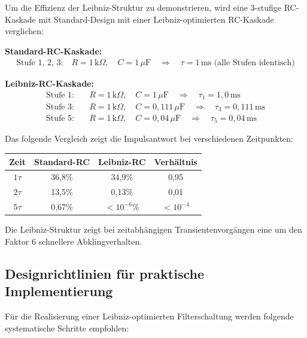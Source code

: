 \documentclass[a4paper,12pt,twoside]{report}
\theoremstyle{definition}
\begin{document}
Um die Effizienz der Leibniz-Struktur zu demonstrieren, wird eine 3-stufige RC-Kaskade mit Standard-Design mit einer Leibniz-optimierten RC-Kaskade verglichen:

\textbf{Standard-RC-Kaskade:}
\begin{align}
	\text{Stufe 1, 2, 3:} \quad R = 1\,\text{k}\Omega, \quad C = 1\,\mu\text{F} \quad \Rightarrow \quad \tau = 1\,\text{ms (alle Stufen identisch)}
\end{align}

\textbf{Leibniz-RC-Kaskade:}
\begin{align}
	\text{Stufe 1:} &\quad R = 1\,\text{k}\Omega, \quad C = 1\,\mu\text{F} \quad \Rightarrow \quad \tau_1 = 1,0\,\text{ms} \\
	\text{Stufe 3:} &\quad R = 1\,\text{k}\Omega, \quad C = 0,111\,\mu\text{F} \quad \Rightarrow \quad \tau_3 = 0,111\,\text{ms} \\
	\text{Stufe 5:} &\quad R = 1\,\text{k}\Omega, \quad C = 0,04\,\mu\text{F} \quad \Rightarrow \quad \tau_5 = 0,04\,\text{ms}
\end{align}

Das folgende Vergleich zeigt die Impulsantwort bei verschiedenen Zeitpunkten:

\begin{center}
\begin{tabular}{c|c|c|c}
Zeit & Standard-RC & Leibniz-RC & Verhältnis \\
\hline
$1\tau$ & 36,8\% & 34,9\% & 0,95 \\
$2\tau$ & 13,5\% & 0,13\% & 0,01 \\
$5\tau$ & 0,67\% & $< 10^{-6}\%$ & $< 10^{-4}$ \\
\end{tabular}
\end{center}

Die Leibniz-Struktur zeigt bei zeitabhängigen Transientenvorgängen eine um den Faktor 6 schnellere Abklingverhalten.

\subsection{Designrichtlinien für praktische Implementierung}

Für die Realisierung einer Leibniz-optimierten Filterschaltung werden folgende systematische Schritte empfohlen:
\end{document}
